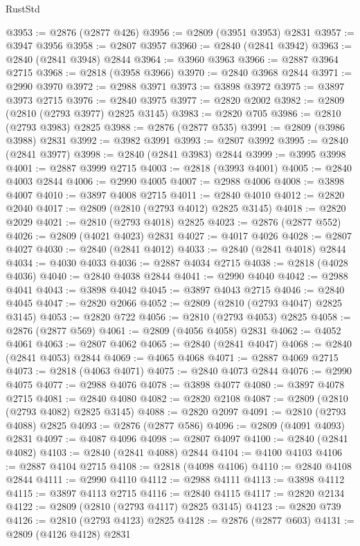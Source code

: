\begin{lexlean}{RustStd}
\begin{coremodule}
@3953 := @2876 (@2877 @426)
@3956 := @2809 (@3951 @3953) @2831
@3957 := @3947 @3956
@3958 := @2807 @3957
@3960 := @2840 (@2841 @3942)
@3963 := @2840 (@2841 @3948) @2844
@3964 := @3960 @3963
@3966 := @2887 @3964 @2715
@3968 := @2818 (@3958 @3966)
@3970 := @2840 @3968 @2844
@3971 := @2990 @3970
@3972 := @2988 @3971
@3973 := @3898 @3972
@3975 := @3897 @3973 @2715
@3976 := @2840 @3975
@3977 := @2820 @2002
@3982 := @2809 (@2810 (@2793 @3977) @2825 @3145)
@3983 := @2820 @705
@3986 := @2810 (@2793 @3983) @2825
@3988 := @2876 (@2877 @535)
@3991 := @2809 (@3986 @3988) @2831
@3992 := @3982 @3991
@3993 := @2807 @3992
@3995 := @2840 (@2841 @3977)
@3998 := @2840 (@2841 @3983) @2844
@3999 := @3995 @3998
@4001 := @2887 @3999 @2715
@4003 := @2818 (@3993 @4001)
@4005 := @2840 @4003 @2844
@4006 := @2990 @4005
@4007 := @2988 @4006
@4008 := @3898 @4007
@4010 := @3897 @4008 @2715
@4011 := @2840 @4010
@4012 := @2820 @2040
@4017 := @2809 (@2810 (@2793 @4012) @2825 @3145)
@4018 := @2820 @2029
@4021 := @2810 (@2793 @4018) @2825
@4023 := @2876 (@2877 @552)
@4026 := @2809 (@4021 @4023) @2831
@4027 := @4017 @4026
@4028 := @2807 @4027
@4030 := @2840 (@2841 @4012)
@4033 := @2840 (@2841 @4018) @2844
@4034 := @4030 @4033
@4036 := @2887 @4034 @2715
@4038 := @2818 (@4028 @4036)
@4040 := @2840 @4038 @2844
@4041 := @2990 @4040
@4042 := @2988 @4041
@4043 := @3898 @4042
@4045 := @3897 @4043 @2715
@4046 := @2840 @4045
@4047 := @2820 @2066
@4052 := @2809 (@2810 (@2793 @4047) @2825 @3145)
@4053 := @2820 @722
@4056 := @2810 (@2793 @4053) @2825
@4058 := @2876 (@2877 @569)
@4061 := @2809 (@4056 @4058) @2831
@4062 := @4052 @4061
@4063 := @2807 @4062
@4065 := @2840 (@2841 @4047)
@4068 := @2840 (@2841 @4053) @2844
@4069 := @4065 @4068
@4071 := @2887 @4069 @2715
@4073 := @2818 (@4063 @4071)
@4075 := @2840 @4073 @2844
@4076 := @2990 @4075
@4077 := @2988 @4076
@4078 := @3898 @4077
@4080 := @3897 @4078 @2715
@4081 := @2840 @4080
@4082 := @2820 @2108
@4087 := @2809 (@2810 (@2793 @4082) @2825 @3145)
@4088 := @2820 @2097
@4091 := @2810 (@2793 @4088) @2825
@4093 := @2876 (@2877 @586)
@4096 := @2809 (@4091 @4093) @2831
@4097 := @4087 @4096
@4098 := @2807 @4097
@4100 := @2840 (@2841 @4082)
@4103 := @2840 (@2841 @4088) @2844
@4104 := @4100 @4103
@4106 := @2887 @4104 @2715
@4108 := @2818 (@4098 @4106)
@4110 := @2840 @4108 @2844
@4111 := @2990 @4110
@4112 := @2988 @4111
@4113 := @3898 @4112
@4115 := @3897 @4113 @2715
@4116 := @2840 @4115
@4117 := @2820 @2134
@4122 := @2809 (@2810 (@2793 @4117) @2825 @3145)
@4123 := @2820 @739
@4126 := @2810 (@2793 @4123) @2825
@4128 := @2876 (@2877 @603)
@4131 := @2809 (@4126 @4128) @2831

\end{coremodule}
\end{lexlean}
